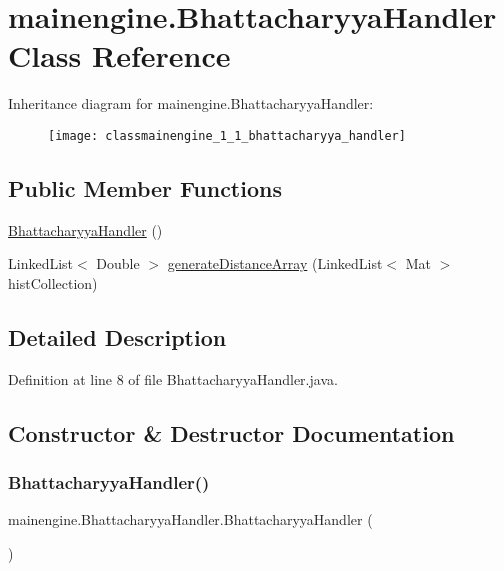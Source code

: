 \hypertarget{classmainengine_1_1_bhattacharyya_handler}{}\section{mainengine.\+Bhattacharyya\+Handler Class Reference}
\label{classmainengine_1_1_bhattacharyya_handler}
Inheritance diagram for mainengine.\+Bhattacharyya\+Handler\+:\begin{figure}[H]
\begin{center}
\leavevmode
\texttt{[image: classmainengine\_1\_1\_bhattacharyya\_handler]}
\end{center}
\end{figure}
\subsection*{Public Member Functions}
\begin{DoxyCompactItemize}
\item 
\hyperlink{classmainengine_1_1_bhattacharyya_handler_acadcb8ecddbf08354628cd771746d67c}{Bhattacharyya\+Handler} ()
\item 
Linked\+List$<$ Double $>$ \hyperlink{classmainengine_1_1_bhattacharyya_handler_aaf0d9ca0ecc056d53a2f6f42f41e0b99}{generate\+Distance\+Array} (Linked\+List$<$ Mat $>$ hist\+Collection)
\end{DoxyCompactItemize}


\subsection{Detailed Description}


Definition at line 8 of file Bhattacharyya\+Handler.\+java.



\subsection{Constructor \& Destructor Documentation}
\hypertarget{classmainengine_1_1_bhattacharyya_handler_acadcb8ecddbf08354628cd771746d67c}{}\label{classmainengine_1_1_bhattacharyya_handler_acadcb8ecddbf08354628cd771746d67c} 
\subsubsection{\texorpdfstring{Bhattacharyya\+Handler()}{BhattacharyyaHandler()}}
{\footnotesize\ttfamily mainengine.\+Bhattacharyya\+Handler.\+Bhattacharyya\+Handler (\begin{DoxyParamCaption}{ }\end{DoxyParamCaption})}



